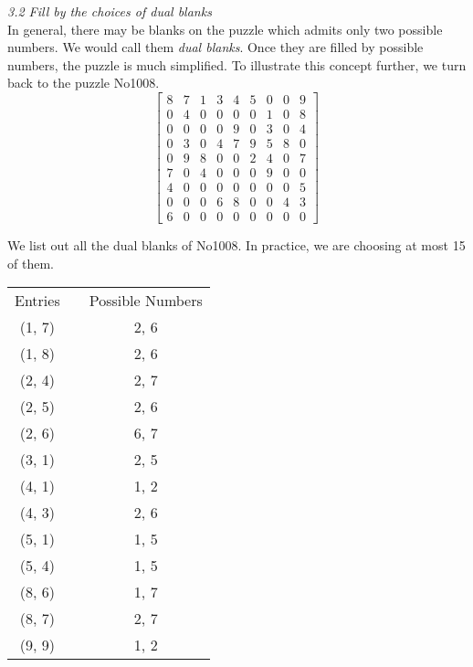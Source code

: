 \documentclass{article}[12pt,a4paper]
\begin{document}
\newpage
{\it 3.2 Fill by the choices of dual blanks} \\[4pt]
In general, there may be blanks on the puzzle which admits only two possible numbers. We would call them {\it dual blanks}.
Once they are filled by possible numbers, the puzzle is much simplified. To illustrate this concept further, 
we turn back to the puzzle No1008. \\
\[ \left [ \begin{array}{ccc|ccc|ccc}
8 & 7 & 1 & 3 & 4 & 5 & 0 & 0 & 9 \\[-0.05in]
0 & 4 & 0 & 0 & 0 & 0 & 1 & 0 & 8 \\[-0.05in]
0 & 0 & 0 & 0 & 9 & 0 & 3 & 0 & 4 \\[-0.05in] \hline
0 & 3 & 0 & 4 & 7 & 9 & 5 & 8 & 0 \\[-0.05in]
0 & 9 & 8 & 0 & 0 & 2 & 4 & 0 & 7 \\[-0.05in]
7 & 0 & 4 & 0 & 0 & 0 & 9 & 0 & 0 \\[-0.05in] \hline
4 & 0 & 0 & 0 & 0 & 0 & 0 & 0 & 5 \\[-0.05in]
0 & 0 & 0 & 6 & 8 & 0 & 0 & 4 & 3 \\[-0.05in]
6 & 0 & 0 & 0 & 0 & 0 & 0 & 0 & 0 
\end{array} \right] \, \]
\vspace*{4pt}

We list out all the dual blanks of No1008. In practice, we are choosing at most 15 of them. 
\begin{center} \begin{tabular}{clc}
Entries &\hspace{5pt}  & Possible Numbers \\
(1, 7) && 2, 6\\
(1, 8) && 2, 6\\
(2, 4) && 2, 7\\
(2, 5) && 2, 6 \\
(2, 6) && 6, 7 \\
(3, 1) && 2, 5 \\
(4, 1) && 1, 2 \\
(4, 3) && 2, 6 \\
(5, 1) && 1, 5 \\
(5, 4) && 1, 5 \\
(8, 6) && 1, 7 \\
(8, 7) && 2, 7 \\
(9, 9) && 1, 2\\
\end{tabular} \end{center}
\vspace*{2pt}
\end{document}
